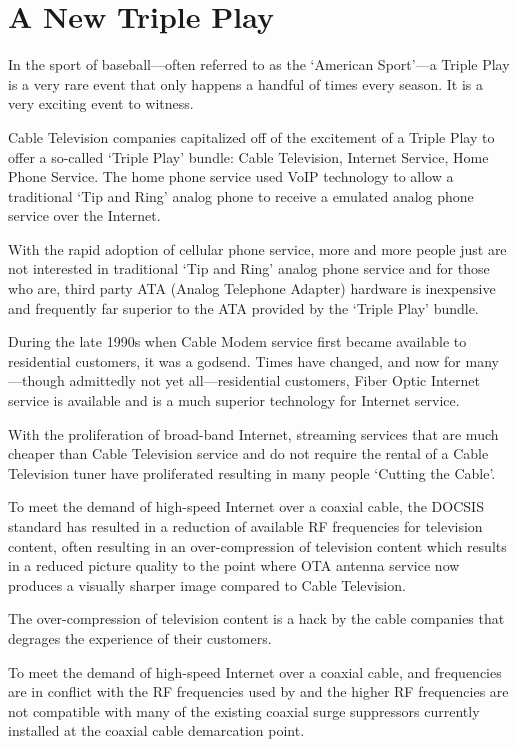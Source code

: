 \chapter{A New Triple Play}

In the sport of baseball---often referred to as the `American Sport'---a Triple
Play is a very rare event that only happens a handful of times every season. It
is a very exciting event to witness.

Cable Television companies capitalized off of the excitement of a Triple Play to
offer a so-called `Triple Play' bundle: Cable Television, Internet Service, Home
Phone Service. The home phone service used VoIP technology to allow a traditional
`Tip and Ring' analog phone to receive a emulated analog phone service over the
Internet.

With the rapid adoption of cellular phone service, more and more people just are
not interested in traditional `Tip and Ring' analog phone service and for those
who are, third party ATA (Analog Telephone Adapter) hardware is inexpensive and
frequently far superior to the ATA provided by the `Triple Play' bundle.

During the late 1990s when Cable Modem service first became available to residential
customers, it was a godsend. Times have changed, and now for many---though admittedly
not yet all---residential customers, Fiber Optic Internet service is available and
is a much superior technology for Internet service.

With the proliferation of broad-band Internet, streaming services that are much
cheaper than Cable Television service and do not require the rental of a Cable Television
tuner have proliferated resulting in many people `Cutting the Cable'.

To meet the demand of high-speed Internet over a coaxial cable, the DOCSIS standard
has resulted in a reduction of available RF frequencies for television content,
often resulting in an over-compression of television content which results in a
reduced picture quality to the point where OTA antenna service now produces a visually
sharper image compared to Cable Television.

The over-compression of television content is a hack by the cable companies that
degrages the experience of their customers.

To meet the demand of high-speed Internet over a coaxial cable,  and
 frequencies are in conflict with the RF frequencies used by
\xdband{} and the higher RF frequencies are not compatible with many of the
existing coaxial surge suppressors currently installed at the coaxial cable
demarcation point.

